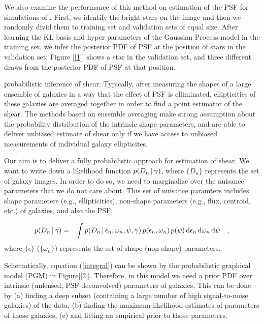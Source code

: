 \documentclass[12pt]{article}
\newcommand{\dd}{\mathrm{d}}
\newcommand{\data}{D}
\newcommand{\intrinsic}{\epsilon}
\newcommand{\shear}{\gamma}
\newcommand{\psf}{\psi}
\begin{document}
We also examine the performance of this method on estimation of the PSF for simulations 
of \lsst. First, we identify the bright stars on the image and then we randomly divid
them to training set and validation sets of equal size. After learning the KL basis and 
hyper parameters of the Gaussian Process model in the training set, we infer the posterior 
PDF of PSF at the position of stars in the validation set. Figure [\ref{1}] shows a star
in the validation set, and three different draws from the posterior PDF of PSF at that position.

probabilistic inference of shear:
Typically, after measuring the shapes
of a large ensemble of galaxies in a way that
the effect of PSF is elliminated, ellipticities
of these galaxies are averaged together in order to
find a point estimator of the shear.
The methods based on ensemble averaging make strong assumption
about the probability distribution of the intrinsic shape parameters,
and are able to deliver unbiased estimate of shear only if we
have access to unbiased measurements of individual galaxy
ellipticites. 

Our aim is to deliver a fully probabilistic approach for estimation of shear.
We want to write down a likelihood function $p(\data_n\given\shear)$, where $\{\data_n\}$
represents the set of galaxy images. In order to do so, we need to marginalize over the
nuisance parameters that we do not care about. This set of nuisance paramters includes 
shape parameters (e.g., ellipticities), non-shape parameters (e.g., flux, centroid, etc.)
of galaxies, and also the PSF

\begin{eqnarray}
p(\data_n\given\shear)
  &=& \int p(\data_n\given\intrinsic_n , \omega_{n}, \psf , \shear)
  \,p(\intrinsic_n, \omega_{n})\,p(\psf)\,\dd\intrinsic_n\,\dd\omega_n\,\dd\psf
  \quad ,
\label{integral}
\end{eqnarray}
where $\{\intrinsic\}$ ($\{\omega_{n}\}$) represents the set of shape
(non-shape) parameters.

Schematically, equation (\ref{integral}) can be shown by the probabilistic
graphical model (PGM) in Figure[\ref{2}]. Therefore, in this model we need
a prior PDF over intrinsic (unlensed, PSF deconvolved) parameters of galaxies.
This can be done by (a) finding a deep subset (containing a large number of high
signal-to-noise galaxies) of the data, (b) finding the maximum-likelihood estimates
of parameters of those galaxies, (c) and fitting an empirical prior to those parameters. 
\end{document}
